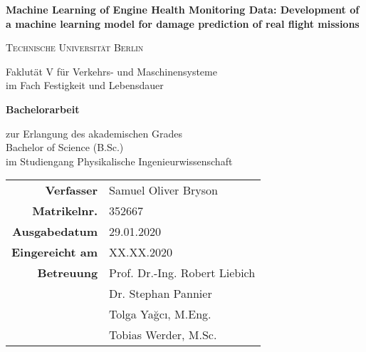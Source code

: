 
\begin{titlepage}

        \hfill {}

        \centering
        \vspace{1.5cm}
        {\Large \textbf{Machine Learning of Engine Health Monitoring Data: Development of a machine learning model for damage prediction of real flight missions}\par}
        \vspace{1cm}
        {\scshape\Large Technische Universit\"at Berlin \par}
        \vspace{0.2cm}
        {\large Faklut\"at V f\"ur Verkehrs- und Maschinensysteme\\im Fach Festigkeit und Lebensdauer\par}
        \vspace{1.5cm}
        {\huge\bfseries Bachelorarbeit\par}
        \vspace{0.6cm}
        {\large zur Erlangung des akademischen Grades \\Bachelor of Science (B.Sc.)\\im Studiengang Physikalische Ingenieurwissenschaft\par}
        \vspace{1.2cm}
        \begin{tabular}{>{\bfseries}r l}
            Verfasser & Samuel Oliver Bryson \\
            Matrikelnr. & 352667 \\
            Ausgabedatum & 29.01.2020 \\
            Eingereicht am & XX.XX.2020 \\
            Betreuung & Prof. Dr.-Ing. Robert Liebich \\
            & Dr. Stephan Pannier \\
            & Tolga Ya\u{g}c\i{}, M.Eng.\\
            & Tobias Werder, M.Sc.\\
        \end{tabular}

\end{titlepage}